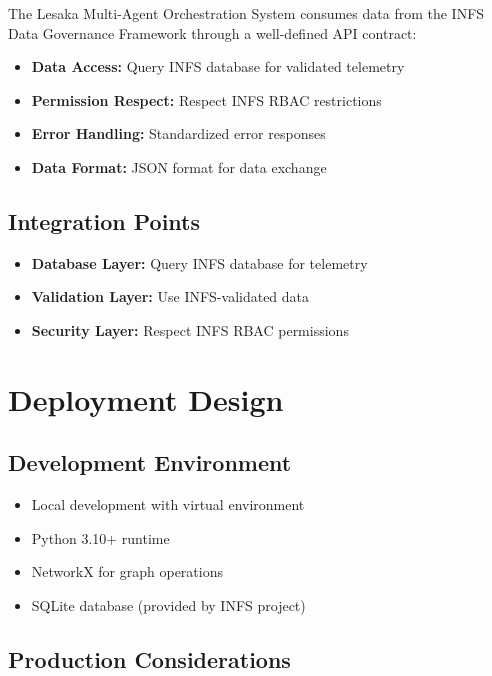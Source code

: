 The Lesaka Multi-Agent Orchestration System consumes data from the INFS Data Governance Framework through a well-defined API contract:

\begin{itemize}
    \item \textbf{Data Access:} Query INFS database for validated telemetry
    \item \textbf{Permission Respect:} Respect INFS RBAC restrictions
    \item \textbf{Error Handling:} Standardized error responses
    \item \textbf{Data Format:} JSON format for data exchange
\end{itemize}

\subsection{Integration Points}

\begin{itemize}
    \item \textbf{Database Layer:} Query INFS database for telemetry
    \item \textbf{Validation Layer:} Use INFS-validated data
    \item \textbf{Security Layer:} Respect INFS RBAC permissions
\end{itemize}

\section{Deployment Design}

\subsection{Development Environment}

\begin{itemize}
    \item Local development with virtual environment
    \item Python 3.10+ runtime
    \item NetworkX for graph operations
    \item SQLite database (provided by INFS project)
\end{itemize}

\subsection{Production Considerations}

